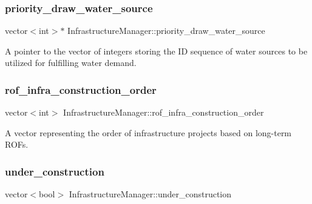 \subsubsection{\texorpdfstring{priority\+\_\+draw\+\_\+water\+\_\+source}{priority\_draw\_water\_source}}
{\footnotesize\ttfamily vector$<$int$>$$\ast$ Infrastructure\+Manager\+::priority\+\_\+draw\+\_\+water\+\_\+source\hspace{0.3cm}{\ttfamily [private]}}



A pointer to the vector of integers storing the ID sequence of water sources to be utilized for fulfilling water demand. 

\mbox{\label{classInfrastructureManager_a21b02e6d9ca7f90cfb289a48cec723cb}} 
\subsubsection{\texorpdfstring{rof\+\_\+infra\+\_\+construction\+\_\+order}{rof\_infra\_construction\_order}}
{\footnotesize\ttfamily vector$<$int$>$ Infrastructure\+Manager\+::rof\+\_\+infra\+\_\+construction\+\_\+order\hspace{0.3cm}{\ttfamily [private]}}



A vector representing the order of infrastructure projects based on long-\/term R\+O\+Fs. 

\mbox{\label{classInfrastructureManager_a634ca1b01e1b7fa7c8b5468c9a842a51}} 
\subsubsection{\texorpdfstring{under\+\_\+construction}{under\_construction}}
{\footnotesize\ttfamily vector$<$bool$>$ Infrastructure\+Manager\+::under\+\_\+construction\hspace{0.3cm}{\ttfamily [private]}}



